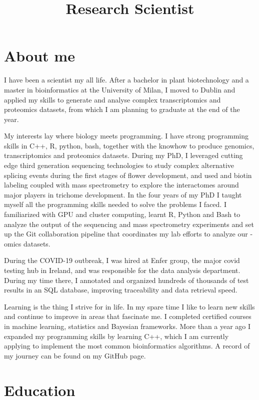 \documentclass{moderncv}
\title{Research Scientist}
\begin{document}
\maketitle
\section{About me}
I have been a scientist my all life. After a bachelor in plant biotechnology
and a master in bioinformatics at the University of Milan, I moved to Dublin
and applied my skills to generate and analyse complex transcriptomics and
proteomics datasets, from which I am planning to graduate at the end of the
year.

My interests lay where biology meets programming. I have strong programming
skills in C++, R, python, bash, together with the knowhow to produce genomics,
transcriptomics and proteomics datasets. During my PhD, I leveraged cutting
edge third generation sequencing technologies to study complex alternative
splicing events during the first stages of flower development, and used and
biotin labeling coupled with mass spectrometry to explore the interactomes
around major players in trichome development. In the four years of my PhD I
taught myself all the programming skills needed to solve the problems I faced.
I familiarized with GPU and cluster computing, learnt R, Python and Bash to
analyze the output of the sequencing and mass spectrometry experiments and set
up the Git collaboration pipeline that coordinates my lab efforts to analyze
our -omics datasets.

During the COVID-19 outbreak, I was hired at Enfer group, the major covid
testing hub in Ireland, and was responsible for the data analysis department.
During my time there, I annotated and organized hundreds of thousands of test
results in an SQL database, improving traceability and data retrieval speed.

Learning is the thing I strive for in life. In my spare time I like to learn
new skills and continue to improve in areas that fascinate me. I completed
certified courses in machine learning, statistics and Bayesian frameworks.
More than a year ago I expanded my programming skills by learning C++, which I
am currently applying to implement the most common bioinformatics algorithms.
A record of my journey can be found on my GitHub page.
%
\closesection{}
\pagebreak
%
\section{Education}
\end{document}
